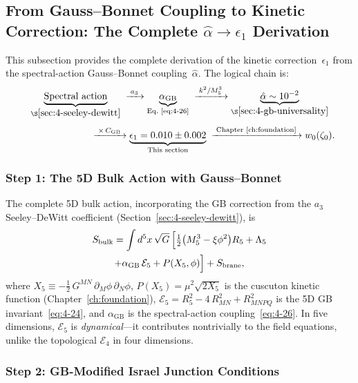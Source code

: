 \subsection{From Gauss--Bonnet Coupling to Kinetic Correction: The Complete $\hat{\alpha} \to \epsilon_1$ Derivation}
\label{sec:4-epsilon1}

This subsection provides the complete derivation of the kinetic correction~$\epsilon_1$ from the spectral-action Gauss--Bonnet coupling~$\hat{\alpha}$. The logical chain is:
\[
  \underbrace{\text{Spectral action}}_{\S\ref{sec:4-seeley-dewitt}}
  \;\xrightarrow{\;a_3\;}
  \underbrace{\alpha_{\mathrm{GB}}}_{\text{Eq.~\eqref{eq:4-26}}}
  \;\xrightarrow{\;k^2/M_5^3\;}
  \underbrace{\hat{\alpha} \sim 10^{-2}}_{\S\ref{sec:4-gb-universality}}
\]
\vspace{-0.5em}
\[
  \phantom{\text{Spectral action}}
  \;\xrightarrow{\;\times\, C_{\mathrm{GB}}\;}
  \underbrace{\epsilon_1 = 0.010 \pm 0.002}_{\text{This section}}
  \;\xrightarrow{\;\text{Chapter~\ref{ch:foundation}}\;}
  w_0(\zeta_0).
\]


\subsubsection{Step 1: The 5D Bulk Action with Gauss--Bonnet}

The complete 5D bulk action, incorporating the GB correction from the $a_3$ Seeley--DeWitt coefficient (Section~\ref{sec:4-seeley-dewitt}), is
\begin{multline}
  S_{\mathrm{bulk}} = \int d^5x\, \sqrt{G}\, \Bigl[
    \tfrac{1}{2}\bigl(M_5^3 - \xi\phi^2\bigr) R_5
    + \Lambda_5 \\
    + \alpha_{\mathrm{GB}}\, \mathcal{E}_5
    + P(X_5, \phi)
  \Bigr]
  + S_{\mathrm{brane}},
  \label{eq:4-36}
\end{multline}
where $X_5 \equiv -\tfrac{1}{2}\, G^{MN}\, \partial_M\phi\, \partial_N\phi$, $P(X_5) = \mu^2\sqrt{2X_5}$ is the cuscuton kinetic function (Chapter~\ref{ch:foundation}), $\mathcal{E}_5 = R_5^2 - 4\,R_{MN}^2 + R_{MNPQ}^2$ is the 5D GB invariant~\eqref{eq:4-24}, and $\alpha_{\mathrm{GB}}$ is the spectral-action coupling~\eqref{eq:4-26}. In five dimensions, $\mathcal{E}_5$ is \emph{dynamical}---it contributes nontrivially to the field equations, unlike the topological $\mathcal{E}_4$ in four dimensions.


\subsubsection{Step 2: GB-Modified Israel Junction Conditions}

